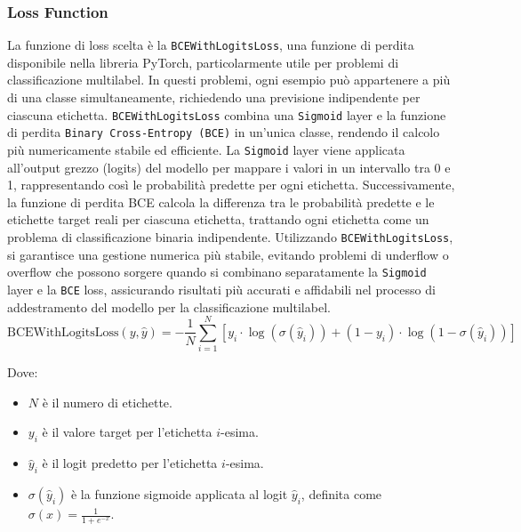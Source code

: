 \documentclass[../../Thesis.tex]{subfiles}
\begin{document}
\subsubsection{Loss Function}
La funzione di loss scelta è la \texttt{BCEWithLogitsLoss}, una funzione di perdita disponibile nella libreria PyTorch, particolarmente utile per problemi di classificazione multilabel. In questi problemi, ogni esempio può appartenere a più di una classe simultaneamente, richiedendo una previsione indipendente per ciascuna etichetta. \texttt{BCEWithLogitsLoss} combina una \texttt{Sigmoid} layer e la funzione di perdita \texttt{Binary Cross-Entropy (BCE)} in un'unica classe, rendendo il calcolo più numericamente stabile ed efficiente. La \texttt{Sigmoid} layer viene applicata all'output grezzo (logits) del modello per mappare i valori in un intervallo tra 0 e 1, rappresentando così le probabilità predette per ogni etichetta. Successivamente, la funzione di perdita BCE calcola la differenza tra le probabilità predette e le etichette target reali per ciascuna etichetta, trattando ogni etichetta come un problema di classificazione binaria indipendente. Utilizzando \texttt{BCEWithLogitsLoss}, si garantisce una gestione numerica più stabile, evitando problemi di underflow o overflow che possono sorgere quando si combinano separatamente la \texttt{Sigmoid} layer e la \texttt{BCE} loss, assicurando risultati più accurati e affidabili nel processo di addestramento del modello per la classificazione multilabel.
$$
\text{BCEWithLogitsLoss}(y, \hat{y}) = - \frac{1}{N} \sum_{i=1}^{N} \left[ y_i \cdot \log(\sigma(\hat{y}_i)) + (1 - y_i) \cdot \log(1 - \sigma(\hat{y}_i)) \right]
$$

Dove:
\begin{itemize}
    \item $ N $ è il numero di etichette.
    \item $ y_i $ è il valore target per l'etichetta $ i $-esima.
    \item $ \hat{y}_i $ è il logit predetto per l'etichetta $ i $-esima.
    \item $ \sigma(\hat{y}_i) $ è la funzione sigmoide applicata al logit $ \hat{y}_i $, definita come $ \sigma(x) = \frac{1}{1 + e^{-x}} $.
\end{itemize}
\end{document}
